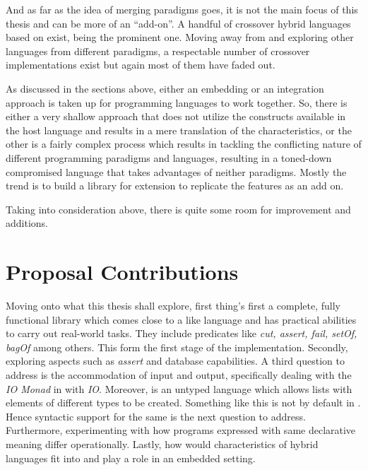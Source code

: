\documentclass[thesis-solanki.tex]{subfiles}
\begin{document}
And as far as the idea of merging paradigms goes, it is not the main focus of this thesis and can be more of an
``add-on''.
A handful of crossover hybrid languages based on  exist,  \cite{website:curry}
being the prominent one.
Moving away from  and exploring other languages from different paradigms, a respectable number of
crossover implementations exist but again most of them have faded out.

As discussed in the sections above, either an embedding or an integration approach is taken up for programming
languages to work together.
So, there is either a very shallow approach that does not utilize the constructs available in the host language and
results in a mere translation of the characteristics, or the other is a fairly complex process which results in
tackling the conflicting nature of different programming paradigms and languages, resulting in a toned-down
compromised language that takes advantages of neither paradigms.
Mostly the trend is to build a library for extension to replicate the features as an add on.

Taking into consideration above, there is quite some room for improvement and additions.
\section{Proposal Contributions}

Moving onto what this thesis shall explore, first thing's first a complete, fully functional library which comes
close to a  like language and has practical abilities to carry out real-world tasks.
They include predicates like \textit{cut, assert, fail, setOf, bagOf} among others.
This form
the first stage of the implementation.
Secondly, exploring aspects such as \textit{assert} and database capabilities.
A third question to address is the accommodation of input and output, specifically dealing with the \textit{IO
  Monad} in  with  \textit{IO}.
Moreover,  is an untyped language which allows lists with elements of different types to be
created.
Something like this is not by default in .
Hence syntactic support for the same is the next question to address.
Furthermore, experimenting with how programs expressed with same declarative meaning differ operationally.
Lastly, how would characteristics of hybrid languages fit into and play a role in an embedded setting.
\end{document}
